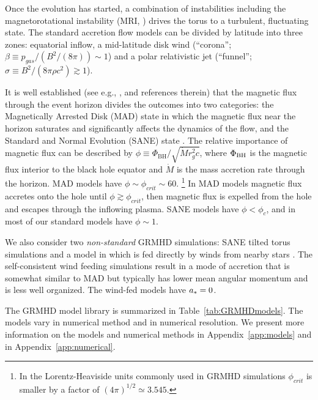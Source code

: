 Once the evolution has started, a combination of instabilities including the magnetorotational instability (MRI, \citealt{1992ApJ...400..610B}) drives the torus to a turbulent, fluctuating state. The standard accretion flow models can be divided by  latitude into three zones: equatorial inflow, a mid-latitude disk wind (``corona''; $\beta \equiv p_{gas}/(B^2/(8\pi)) \sim 1$) and a polar relativistic jet (``funnel''; $\sigma \equiv B^2/(8\pi \rho c^2) \gtrsim 1$).

It is well established (see e.g., ,  and references therein) that the magnetic flux through the event horizon divides the outcomes into two categories: the Magnetically Arrested Disk (MAD) state \citep[e.g.,][]{bisnovatyi:1974,Igumenschchev:2003,2003PASJ...55L..69N} in which the magnetic flux near the horizon saturates and significantly affects the dynamics of the flow, and the Standard and Normal Evolution (SANE) state \citep[e.g.,][]{2003ApJ...589..444G, devilliers:2003, Narayan:2012}.  The relative importance of magnetic flux can be described by $\phi \equiv \Phi_{\mathrm{BH}}/ \sqrt{\dot{M} r_g^2 c}$, where $\Phi_{\rm BH}$ is the magnetic flux interior to the black hole equator and $\dot{M}$ is the mass accretion rate through the horizon. MAD models have $\phi \sim \phi_{crit} \sim 60$. \footnote{In the Lorentz-Heaviside units commonly used in GRMHD simulations $\phi_{crit}$ is smaller by a factor of $(4\pi)^{1/2} \simeq 3.545$.}  In MAD models magnetic flux accretes onto the hole until $\phi \gtrsim \phi_{crit}$, then magnetic flux is expelled from the hole and escapes through the inflowing plasma.  SANE models have $\phi < \phi_c$, and in most of our standard models have $\phi \sim 1$.

We also consider two {\it non-standard} GRMHD simulations: SANE tilted torus simulations \citep{ref} and a model in which \sgra is fed directly by winds from nearby stars \sgra \citep{2020ApJ...896L...6R}. The self-consistent wind feeding simulations result in a mode of accretion that is somewhat similar to MAD but typically has lower mean angular momentum and is less well organized.
The wind-fed models have $a_* = 0$.

The GRMHD model library is summarized in Table~\ref{tab:GRMHDmodels}. The models vary in numerical method and in numerical resolution. We present more information on the models and numerical methods in Appendix~\ref{app:models} and in  Appendix~\ref{app:numerical}.


